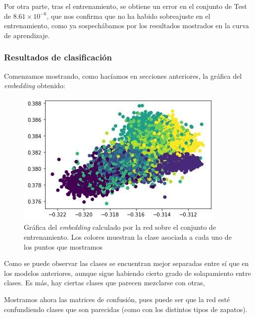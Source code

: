 \documentclass[11pt]{article}
\begin{document}
Por otra parte, tras el entrenamiento, se obtiene un error en el conjunto de Test de $8.61 \times 10^{-6}$, que nos confirma que no ha habido sobreajuste en el entrenamiento, como ya sospechábamos por los resultados mostrados en la curva de aprendizaje.

\subsubsection{Resultados de clasificación}

Comenzamos mostrando, como hacíamos en secciones anteriores, la gráfica del \emph{embedding} obtenido:

\begin{figure}[H]
    \centering
    \includegraphics[width = 0.5 \textwidth]{triples_light_embedding}
    \caption{Gráfica del \emph{embedding} calculado por la red sobre el conjunto de entrenamiento. Los colores muestran la clase asociada a cada uno de los puntos que mostramos}
\end{figure}

Como se puede observar las clases se encuentran mejor separadas entre sí que en los modelos anteriores, aunque sigue habiendo cierto grado de solapamiento entre clases. Es más, hay ciertas clases que parecen mezclarse con otras,

Mostramos ahora las matrices de confusión, pues puede ser que la red esté confundiendo clases que son parecidas (como con los distintos tipos de zapatos).
\end{document}
